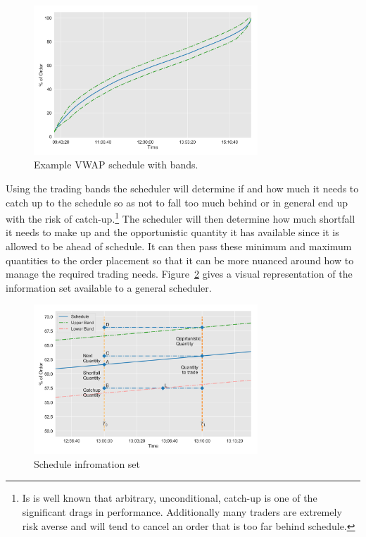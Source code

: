 	\begin{figure}[!ht]
	\centering
	\includegraphics[width=0.75\textwidth]{chapters/chapter_exec_models/figures/schedule.png} 
	\caption{Example VWAP schedule with bands.\label{fig:schedule}}
	\end{figure}


Using the trading bands the scheduler will determine if and how much it needs to catch up to the schedule so as not to fall too much behind or in general end up with the risk of catch-up.\footnote{Is is well known that arbitrary, unconditional, catch-up is one of the significant drags in performance. Additionally many traders are extremely risk averse and will tend to cancel an order that is too far behind schedule.} The scheduler will then determine how much shortfall it needs to make up and the opportunistic quantity it has available since it is allowed to be ahead of schedule. It can then pass these minimum and maximum quantities to the order placement so that it can be more nuanced around how to manage the required trading needs. Figure~\ref{fig:sch_details} gives a visual representation of the information set available to a general scheduler.


	\begin{figure}[!ht]
	\centering
	\includegraphics[width=0.75\textwidth]{chapters/chapter_exec_models/figures/schedule_details.png} 
	\caption{Schedule infromation set \label{fig:sch_details}}
	\end{figure}


